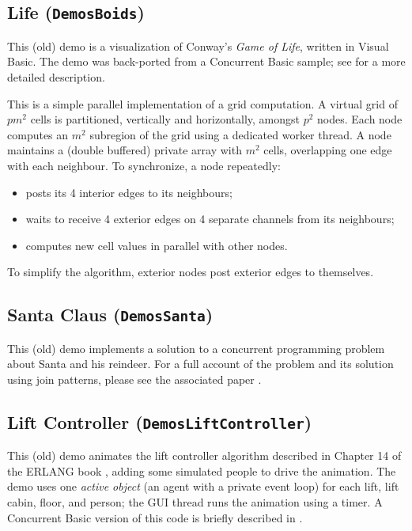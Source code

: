\documentclass{article}
\newcommand{\demo}[1]{\texorpdfstring{{(\texttt{Demos{\symbol{92}}#1})}}{}}
\begin{document}
\subsection{Life \demo{Boids}}

This (old) demo is a visualization of Conway's \emph{Game of Life}, written in Visual Basic. The demo was 
back-ported from a Concurrent Basic sample; see \cite{oopsla08cb} for a more detailed description.

This is a simple parallel implementation of a grid computation.
A virtual grid of $pm^2$ cells is partitioned, vertically and horizontally, amongst $p^2$ nodes.
Each node computes an $m^2$ subregion of the grid using a dedicated worker thread.
A node maintains a (double buffered) private array with $m^2$ cells, overlapping one edge with each neighbour.
To synchronize, a node repeatedly:  
\begin{itemize}
\item posts its 4 interior edges to its neighbours;
\item waits to receive 4 exterior edges on 4 separate channels from its  neighbours;
\item computes new cell values in parallel with other nodes.
\end{itemize}
To simplify the algorithm, exterior nodes post exterior edges to themselves.

\subsection{Santa Claus \demo{Santa}}
This (old) demo implements a solution to a concurrent programming problem
about Santa and his reindeer. For a full account of the problem and
its solution using join patterns, please see the associated paper \cite{benton:santa}.

\subsection{Lift Controller \demo{LiftController}}

This (old) demo animates the lift controller algorithm described in Chapter
14 of the ERLANG book \cite{erlang}, adding some simulated people
to drive the animation.  The demo uses one \emph{active object} (an agent with a private event loop) for each lift,
lift cabin, floor, and person; the GUI thread runs the animation using a timer. 
A Concurrent Basic version of this code is briefly  described in \cite{oopsla08cb}.




\end{document}
